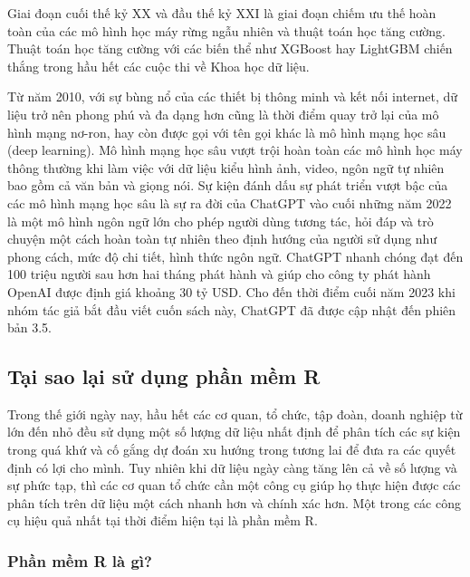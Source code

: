 \documentclass[
]{article}
\begin{document}
Giai đoạn cuối thế kỷ XX và đầu thế kỷ XXI là giai đoạn chiếm ưu thế hoàn toàn của các mô hình học máy rừng ngẫu nhiên và thuật toán học tăng cường. Thuật toán học tăng cường với các biến thể như XGBoost hay LightGBM chiến thắng trong hầu hết các cuộc thi về Khoa học dữ liệu.

Từ năm 2010, với sự bùng nổ của các thiết bị thông minh và kết nối internet, dữ liệu trở nên phong phú và đa dạng hơn cũng là thời điểm quay trở lại của mô hình mạng nơ-ron, hay còn được gọi với tên gọi khác là mô hình mạng học sâu (deep learning). Mô hình mạng học sâu vượt trội hoàn toàn các mô hình học máy thông thường khi làm việc với dữ liệu kiểu hình ảnh, video, ngôn ngữ tự nhiên bao gồm cả văn bản và giọng nói. Sự kiện đánh dấu sự phát triển vượt bậc của các mô hình mạng học sâu là sự ra đời của ChatGPT vào cuối những năm 2022 là một mô hình ngôn ngữ lớn cho phép người dùng tương tác, hỏi đáp và trò chuyện một cách hoàn toàn tự nhiên theo định hướng của người sử dụng như phong cách, mức độ chi tiết, hình thức ngôn ngữ. ChatGPT nhanh chóng đạt đến 100 triệu người sau hơn hai tháng phát hành và giúp cho công ty phát hành OpenAI được định giá khoảng 30 tỷ USD. Cho đến thời điểm cuối năm 2023 khi nhóm tác giả bắt đầu viết cuốn sách này, ChatGPT đã được cập nhật đến phiên bản 3.5.

\hypertarget{tux1ea1i-sao-lux1ea1i-sux1eed-dux1ee5ng-phux1ea7n-mux1ec1m-r}{%
\subsection{Tại sao lại sử dụng phần mềm R}\label{tux1ea1i-sao-lux1ea1i-sux1eed-dux1ee5ng-phux1ea7n-mux1ec1m-r}}

Trong thế giới ngày nay, hầu hết các cơ quan, tổ chức, tập đoàn, doanh nghiệp từ lớn đến nhỏ đều sử dụng một số lượng dữ liệu nhất định để phân tích các sự kiện trong quá khứ và cố gắng dự đoán xu hướng trong tương lai để đưa ra các quyết định có lợi cho mình. Tuy nhiên khi dữ liệu ngày càng tăng lên cả về số lượng và sự phức tạp, thì các cơ quan tổ chức cần một công cụ giúp họ thực hiện được các phân tích trên dữ liệu một cách nhanh hơn và chính xác hơn. Một trong các công cụ hiệu quả nhất tại thời điểm hiện tại là phần mềm R.

\hypertarget{phux1ea7n-mux1ec1m-r-luxe0-guxec}{%
\subsubsection{Phần mềm R là gì?}\label{phux1ea7n-mux1ec1m-r-luxe0-guxec}}
\end{document}
